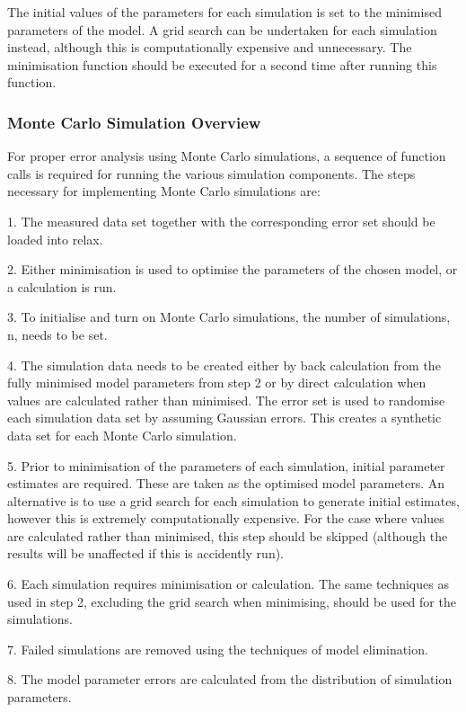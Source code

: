 The initial values of the parameters for each simulation is set to the minimised parameters
of the model.  A grid search can be undertaken for each simulation instead, although this
is computationally expensive and unnecessary.  The minimisation function should be executed
for a second time after running this function.



\subsubsection{Monte Carlo Simulation Overview}

For proper error analysis using Monte Carlo simulations, a sequence of function calls is
required for running the various simulation components.  The steps necessary for
implementing Monte Carlo simulations are:

1.  The measured data set together with the corresponding error set should be loaded into
relax.

2.  Either minimisation is used to optimise the parameters of the chosen model, or a
calculation is run.

3.  To initialise and turn on Monte Carlo simulations, the number of simulations, n, needs
to be set.

4.  The simulation data needs to be created either by back calculation from the fully
minimised model parameters from step 2 or by direct calculation when values are calculated
rather than minimised.  The error set is used to randomise each simulation data set by
assuming Gaussian errors.  This creates a synthetic data set for each Monte Carlo
simulation.

5.  Prior to minimisation of the parameters of each simulation, initial parameter estimates
are required.  These are taken as the optimised model parameters.  An alternative is to use
a grid search for each simulation to generate initial estimates, however this is extremely
computationally expensive.  For the case where values are calculated rather than minimised,
this step should be skipped (although the results will be unaffected if this is accidently
run).

6.  Each simulation requires minimisation or calculation.  The same techniques as used in
step 2, excluding the grid search when minimising, should be used for the simulations.

7.  Failed simulations are removed using the techniques of model elimination.

8.  The model parameter errors are calculated from the distribution of simulation
parameters.


